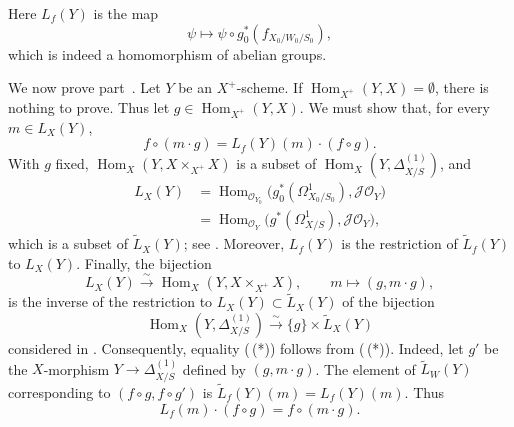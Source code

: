 Here \(L_f(Y)\) is the map
\[
 \psi\longmapsto
 \psi\circ g_0^*(f_{X_0/W_0/S_0}),
\]
which is indeed a homomorphism of abelian groups.

We now prove part~. Let \(Y\) be an \(X^+\)-scheme. If
\(\operatorname{Hom}_{X^+}(Y,X)=\emptyset\), there is nothing to
prove. Thus let \(g\in\operatorname{Hom}_{X^+}(Y,X)\). We must show
that, for every \(m\in L_X(Y)\),
\begin{equation}
 f\circ(m\cdot g)=L_f(Y)(m)\cdot(f\circ g).
 \tag{0.1.10\,(*)}\label{sga3:iii:corollary:0-1-10:equation:0-1-10-star}
\end{equation}
With \(g\) fixed,
\(\operatorname{Hom}_X(Y,X\times_{X^+}X)\) is a subset of
\(\operatorname{Hom}_X(Y,\Delta^{(1)}_{X/S})\), and
\[
\begin{aligned}
 L_X(Y)
 &=\operatorname{Hom}_{\mathscr O_{Y_0}}
   \bigl(g_0^*(\Omega^1_{X_0/S_0}),\mathscr J\mathscr O_Y\bigr)\\
 &=\operatorname{Hom}_{\mathscr O_Y}
   \bigl(g^*(\Omega^1_{X/S}),\mathscr J\mathscr O_Y\bigr),
\end{aligned}
\]
which is a subset of \(\widetilde L_X(Y)\); see . Moreover,
\(L_f(Y)\) is the restriction of \(\widetilde L_f(Y)\) to
\(L_X(Y)\). Finally, the bijection
\[
 L_X(Y)\xrightarrow{\sim}
 \operatorname{Hom}_X(Y,X\times_{X^+}X),
 \qquad
 m\longmapsto(g,m\cdot g),
\]
is the inverse of the restriction to
\(L_X(Y)\subset\widetilde L_X(Y)\) of the bijection
\[
 \operatorname{Hom}_X(Y,\Delta^{(1)}_{X/S})
 \xrightarrow{\sim}\{g\}\times\widetilde L_X(Y)
\]
considered in . Consequently, equality (\,(*)) follows
from (\,(*)). Indeed, let \(g'\) be the \(X\)-morphism
\(Y\to\Delta^{(1)}_{X/S}\) defined by \((g,m\cdot g)\). The element
of \(\widetilde L_W(Y)\) corresponding to
\((f\circ g,f\circ g')\) is
\(\widetilde L_f(Y)(m)=L_f(Y)(m)\). Thus
\[
 L_f(m)\cdot(f\circ g)=f\circ(m\cdot g).
\]

